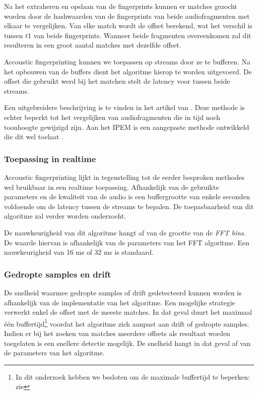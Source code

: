Na het extraheren en opslaan van de fingerprints kunnen er matches gezocht worden door de hashwaarden van de fingerprints van beide audiofragmenten met elkaar te vergelijken. Van elke match wordt de offset berekend, wat het verschil is tussen $ t1 $ van beide fingerprints. Wanneer beide fragmenten overeenkomen zal dit resulteren in een groot aantal matches met dezelfde offset. 

Accoustic fingerprinting kunnen we toepassen op streams door ze te bufferen. Na het opbouwen van de buffers dient het algoritme hierop te worden uitgevoerd. De offset die gebruikt werd bij het matchen stelt de latency voor tussen beide streams.

Een uitgebreidere beschrijving is te vinden in het artikel van . Deze methode is echter beperkt tot het vergelijken van audiofragmenten die in tijd noch toonhoogte gewijzigd zijn. Aan het IPEM is een aangepaste methode ontwikkeld die dit wel toelaat \cite{six2014panako}.

\subsubsection{Toepassing in realtime}

Accoustic fingerprinting lijkt in tegenstelling tot de eerder besproken methodes wel bruikbaar in een realtime toepassing. Afhankelijk van de gebruikte parameters en de kwaliteit van de audio is een buffergrootte van enkele seconden voldoende om de latency tussen de streams te bepalen. De toepasbaarheid van dit algoritme zal verder worden onderzocht.

De nauwkeurigheid van dit algoritme hangt af van de grootte van de \textit{FFT bins}. De waarde hiervan is afhankelijk van de parameters van het FFT algoritme. Een nauwkeurigheid van 16 ms of 32 ms is standaard.

\subsubsection{Gedropte samples en drift}

De snelheid waarmee gedropte samples of drift gedetecteerd kunnen worden is afhankelijk van de implementatie van het algoritme. Een mogelijke strategie verwerkt enkel de offset met de meeste matches. In dat geval duurt het maximaal één buffertijd\footnote{In dit onderzoek hebben we besloten om de maximale buffertijd te beperken: zie } voordat het algoritme zich aanpast aan drift of gedropte samples. Indien er bij het zoeken van matches meerdere offsets als resultaat worden toegelaten is een snellere detectie mogelijk. De snelheid hangt in dat geval af van de parameters van het algoritme.

